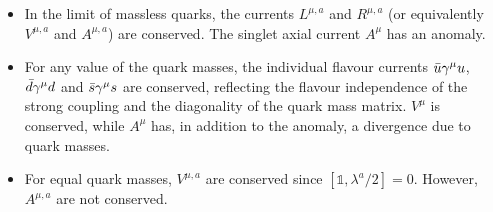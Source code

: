 \documentclass[../main.tex]{subfiles}
\begin{document}
\begin{itemize}
    \item In the limit of massless quarks, the currents $L^{\mu,a}$ and $R^{\mu,a}$ (or equivalently $V^{\mu,a}$ and $A^{\mu,a}$) are conserved. The singlet axial current $A^\mu$ has an anomaly.
    \item For any value of the quark masses, the individual flavour currents $\Bar{u}\gamma^\mu u$, $\Bar{d}\gamma^\mu d$ and $\Bar{s}\gamma^\mu s$ are conserved, reflecting the flavour independence of the strong coupling and the diagonality of the quark mass matrix. $V^\mu$ is conserved, while $A^\mu$ has, in addition to the anomaly, a divergence due to quark masses.
    \item For equal quark masses, $V^{\mu,a}$ are conserved since $[\mathbb{1},\lambda^a/2]=0$. However, $A^{\mu,a}$ are not conserved.
\end{itemize}
\end{document}
